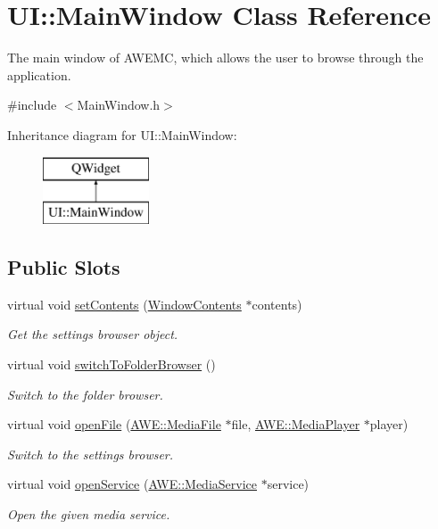 \hypertarget{class_u_i_1_1_main_window}{\section{U\-I\-:\-:Main\-Window Class Reference}
\label{class_u_i_1_1_main_window}
}


The main window of A\-W\-E\-M\-C, which allows the user to browse through the application.  




{\ttfamily \#include $<$Main\-Window.\-h$>$}

Inheritance diagram for U\-I\-:\-:Main\-Window\-:\begin{figure}[H]
\begin{center}
\leavevmode
\includegraphics[height=2.000000cm]{class_u_i_1_1_main_window}
\end{center}
\end{figure}
\subsection*{Public Slots}
\begin{DoxyCompactItemize}
\item 
virtual void \hyperlink{class_u_i_1_1_main_window_a999a8666a6b3deb06d02ab86719ebb30}{set\-Contents} (\hyperlink{class_u_i_1_1_window_contents}{Window\-Contents} $\ast$contents)
\begin{DoxyCompactList}\small\item\em Get the settings browser object. \end{DoxyCompactList}\item 
virtual void \hyperlink{class_u_i_1_1_main_window_ab25444d3dd062e171fd8fd8d010f12e1}{switch\-To\-Folder\-Browser} ()
\begin{DoxyCompactList}\small\item\em Switch to the folder browser. \end{DoxyCompactList}\item 
virtual void \hyperlink{class_u_i_1_1_main_window_a1b35f8b1075ca6ad14d92a21a9204da5}{open\-File} (\hyperlink{class_a_w_e_1_1_media_file}{A\-W\-E\-::\-Media\-File} $\ast$file, \hyperlink{class_a_w_e_1_1_media_player}{A\-W\-E\-::\-Media\-Player} $\ast$player)
\begin{DoxyCompactList}\small\item\em Switch to the settings browser. \end{DoxyCompactList}\item 
virtual void \hyperlink{class_u_i_1_1_main_window_aadae46ef5aadb0104d21fed12e710820}{open\-Service} (\hyperlink{class_a_w_e_1_1_media_service}{A\-W\-E\-::\-Media\-Service} $\ast$service)
\begin{DoxyCompactList}\small\item\em Open the given media service. \end{DoxyCompactList}\end{DoxyCompactItemize}
